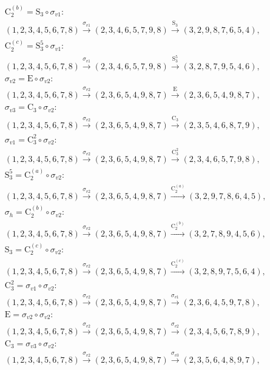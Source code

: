 \begin{align*}
& \mathrm{C}_{2}^{(b)} = \mathrm{S}_{3} \circ \sigma_{v1}:\; \\& (1,2,3,4,5,6,7,8) \xrightarrow{\sigma_{v1}} (2,3,4,6,5,7,9,8) \xrightarrow{\mathrm{S}_{3}} (3,2,9,8,7,6,5,4), \\
& \mathrm{C}_{2}^{(c)} = \mathrm{S}_{3}^{5} \circ \sigma_{v1}:\; \\& (1,2,3,4,5,6,7,8) \xrightarrow{\sigma_{v1}} (2,3,4,6,5,7,9,8) \xrightarrow{\mathrm{S}_{3}^{5}} (3,2,8,7,9,5,4,6), \\
& \sigma_{v2} = \mathrm{E} \circ \sigma_{v2}:\; \\& (1,2,3,4,5,6,7,8) \xrightarrow{\sigma_{v2}} (2,3,6,5,4,9,8,7) \xrightarrow{\mathrm{E}} (2,3,6,5,4,9,8,7), \\
& \sigma_{v3} = \mathrm{C}_{3} \circ \sigma_{v2}:\; \\& (1,2,3,4,5,6,7,8) \xrightarrow{\sigma_{v2}} (2,3,6,5,4,9,8,7) \xrightarrow{\mathrm{C}_{3}} (2,3,5,4,6,8,7,9), \\
& \sigma_{v1} = \mathrm{C}_{3}^{2} \circ \sigma_{v2}:\; \\& (1,2,3,4,5,6,7,8) \xrightarrow{\sigma_{v2}} (2,3,6,5,4,9,8,7) \xrightarrow{\mathrm{C}_{3}^{2}} (2,3,4,6,5,7,9,8), \\
& \mathrm{S}_{3}^{5} = \mathrm{C}_{2}^{(a)} \circ \sigma_{v2}:\; \\& (1,2,3,4,5,6,7,8) \xrightarrow{\sigma_{v2}} (2,3,6,5,4,9,8,7) \xrightarrow{\mathrm{C}_{2}^{(a)}} (3,2,9,7,8,6,4,5), \\
& \sigma_{h} = \mathrm{C}_{2}^{(b)} \circ \sigma_{v2}:\; \\& (1,2,3,4,5,6,7,8) \xrightarrow{\sigma_{v2}} (2,3,6,5,4,9,8,7) \xrightarrow{\mathrm{C}_{2}^{(b)}} (3,2,7,8,9,4,5,6), \\
& \mathrm{S}_{3} = \mathrm{C}_{2}^{(c)} \circ \sigma_{v2}:\; \\& (1,2,3,4,5,6,7,8) \xrightarrow{\sigma_{v2}} (2,3,6,5,4,9,8,7) \xrightarrow{\mathrm{C}_{2}^{(c)}} (3,2,8,9,7,5,6,4), \\
& \mathrm{C}_{3}^{2} = \sigma_{v1} \circ \sigma_{v2}:\; \\& (1,2,3,4,5,6,7,8) \xrightarrow{\sigma_{v2}} (2,3,6,5,4,9,8,7) \xrightarrow{\sigma_{v1}} (2,3,6,4,5,9,7,8), \\
& \mathrm{E} = \sigma_{v2} \circ \sigma_{v2}:\; \\& (1,2,3,4,5,6,7,8) \xrightarrow{\sigma_{v2}} (2,3,6,5,4,9,8,7) \xrightarrow{\sigma_{v2}} (2,3,4,5,6,7,8,9), \\
& \mathrm{C}_{3} = \sigma_{v3} \circ \sigma_{v2}:\; \\& (1,2,3,4,5,6,7,8) \xrightarrow{\sigma_{v2}} (2,3,6,5,4,9,8,7) \xrightarrow{\sigma_{v3}} (2,3,5,6,4,8,9,7), \\

\end{align*}
